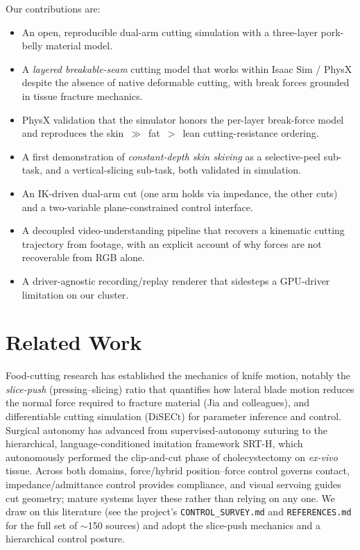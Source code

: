 \documentclass[conference]{IEEEtran}
\begin{document}
Our contributions are:
\begin{itemize}
  \item An open, reproducible dual-arm cutting simulation with a three-layer pork-belly material model.
  \item A \emph{layered breakable-seam} cutting model that works within Isaac Sim / PhysX despite the
        absence of native deformable cutting, with break forces grounded in tissue fracture mechanics.
  \item PhysX validation that the simulator honors the per-layer break-force model and reproduces the
        skin~$\gg$~fat~$>$~lean cutting-resistance ordering.
  \item A first demonstration of \emph{constant-depth skin skiving} as a selective-peel sub-task, and a
        vertical-slicing sub-task, both validated in simulation.
  \item An IK-driven dual-arm cut (one arm holds via impedance, the other cuts) and a two-variable
        plane-constrained control interface.
  \item A decoupled video-understanding pipeline that recovers a kinematic cutting trajectory from
        footage, with an explicit account of why forces are not recoverable from RGB alone.
  \item A driver-agnostic recording/replay renderer that sidesteps a GPU-driver limitation on our
        cluster.
\end{itemize}

\section{Related Work}
\label{sec:related}
Food-cutting research has established the mechanics of knife motion, notably the \emph{slice-push}
(pressing--slicing) ratio that quantifies how lateral blade motion reduces the normal force required to
fracture material (Jia and colleagues), and differentiable cutting simulation (DiSECt) for parameter
inference and control. Surgical autonomy has advanced from supervised-autonomy suturing to the
hierarchical, language-conditioned imitation framework SRT-H, which autonomously performed the
clip-and-cut phase of cholecystectomy on \emph{ex-vivo} tissue. Across both domains, force/hybrid
position--force control governs contact, impedance/admittance control provides compliance, and visual
servoing guides cut geometry; mature systems layer these rather than relying on any one. We draw on
this literature (see the project's \texttt{CONTROL\_SURVEY.md} and \texttt{REFERENCES.md} for the full
set of $\sim$150 sources) and adopt the slice-push mechanics and a hierarchical control posture.
\end{document}
